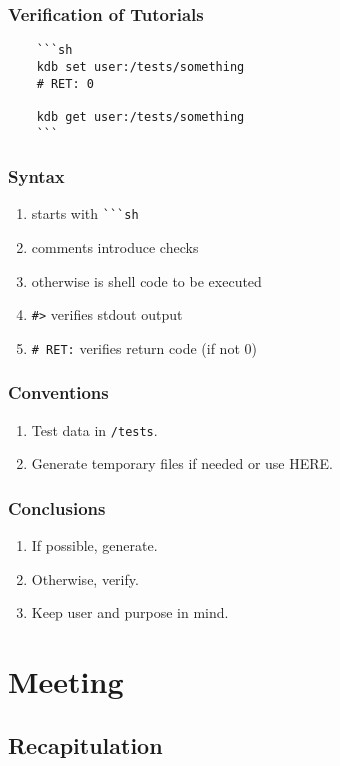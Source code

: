 \begin{frame}[fragile]
	\frametitle{Verification of Tutorials}

	\begin{lstlisting}
	```sh
	kdb set user:/tests/something
	# RET: 0

	kdb get user:/tests/something
	```
\end{lstlisting}
\end{frame}

\begin{frame}[fragile]
	\frametitle{Syntax}

	\begin{enumerate}[<+-| alert@+>]
	\item starts with \verb+```sh+
	\item comments introduce checks
	\item otherwise is shell code to be executed
	\item \verb+#>+ verifies stdout output
	\item \verb+# RET:+ verifies return code (if not 0)
	\end{enumerate}
\end{frame}

\begin{frame}[fragile]
	\frametitle{Conventions}

	\begin{enumerate}[<+-| alert@+>]
	\item Test data in \verb+/tests+.
	\item Generate temporary files if needed or use HERE.
	\end{enumerate}
\end{frame}

\begin{frame}
	\frametitle{Conclusions}

	\begin{enumerate}[<+-| alert@+>]
	\item If possible, generate.
	\item Otherwise, verify.
	\item Keep user and purpose in mind.
	\end{enumerate}
\end{frame}

\section{Meeting}

\subsection{Recapitulation}

